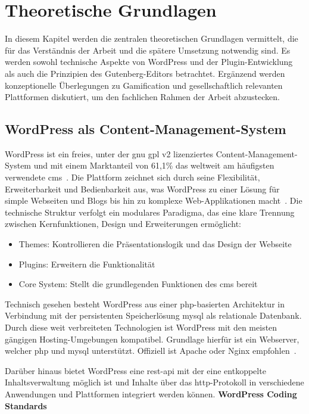 \chapter{Theoretische Grundlagen}
In diesem Kapitel werden die zentralen theoretischen Grundlagen vermittelt, die für das Verständnis der Arbeit und die spätere Umsetzung notwendig sind.
Es werden sowohl technische Aspekte von WordPress und der Plugin-Entwicklung als auch die Prinzipien des Gutenberg-Editors betrachtet.
Ergänzend werden konzeptionelle Überlegungen zu Gamification und gesellschaftlich relevanten Plattformen diskutiert, um den fachlichen Rahmen der Arbeit abzustecken.

\section{WordPress als Content-Management-System}
WordPress ist ein freies, unter der \gls{gnu} \gls{gpl} v2 lizenziertes Content-Management-System und mit einem Marktanteil von 61,1\% das weltweit am häufigsten verwendete \gls{cms}~\cite{statista2025cms}.
Die Plattform zeichnet sich durch seine Flexibilität, Erweiterbarkeit und Bedienbarkeit aus, was WordPress zu einer Lösung für simple Webseiten und Blogs bis hin zu komplexe Web-Applikationen macht~\cite{patel2019review}.
Die technische Struktur verfolgt ein modulares Paradigma, das eine klare Trennung zwischen Kernfunktionen, Design und Erweiterungen ermöglicht:
\begin{itemize}

 \item Themes: Kontrollieren die Präsentationslogik und das Design der Webseite

 \item Plugins: Erweitern die Funktionalität

 \item Core System: Stellt die grundlegenden Funktionen des \gls{cms} bereit

\end{itemize}
Technisch gesehen besteht WordPress aus einer \gls{php}-basierten Architektur in Verbindung mit der persistenten Speicherlösung \gls{mysql} als relationale Datenbank.
Durch diese weit verbreiteten Technologien ist WordPress mit den meisten gängigen Hosting-Umgebungen kompatibel.
Grundlage hierfür ist ein Webserver, welcher \gls{php} und \gls{mysql} unterstützt.
Offiziell ist Apache oder Nginx empfohlen~\cite{wordpress2024requirements}.

Darüber hinaus bietet WordPress eine \gls{rest}-\gls{api} mit der eine entkoppelte Inhaltsverwaltung möglich ist und Inhalte über das \gls{http}-Protokoll in verschiedene Anwendungen und Plattformen integriert werden können.
\newpage
\textbf{WordPress Coding Standards}


